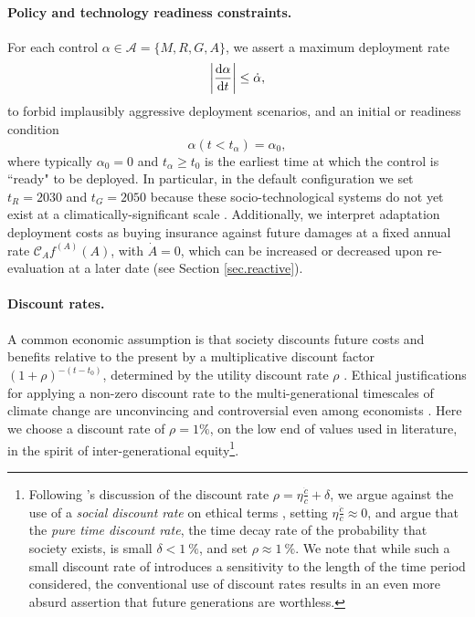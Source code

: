 \documentclass{article}
\begin{document}
\paragraph{Policy and technology readiness constraints.} For each control $\alpha \in \mathcal{A} = \{ M, R, G, A\}$, we assert a maximum deployment rate
\begin{equation}
    \abs{\dv{\alpha}{t}} \le \dot{\alpha},
\end{equation}
to forbid implausibly aggressive deployment scenarios, and an initial or readiness condition
\begin{equation}
    \alpha(t < t_{\alpha}) = \alpha_{0},
\end{equation} where typically $\alpha_{0} = 0$ and $t_{\alpha} \ge t_{0}$ is the earliest time at which the control is ``ready" to be deployed. In particular, in the default configuration we set $t_{R} = 2030$ and $t_{G} = 2050$ because these socio-technological systems do not yet exist at a climatically-significant scale \citep{minx_negative_2018, flegal_solar_2019}. Additionally, we interpret adaptation deployment costs as buying insurance against future damages at a fixed annual rate $\mathcal{C}_{A} f^{(A)}(A)$, with $\dot{A} = 0$, which can be increased or decreased upon re-evaluation at a later date (see Section \ref{sec.reactive}).

\paragraph{Discount rates.} A common economic assumption is that society discounts future costs and benefits relative to the present by a multiplicative discount factor $(1 + \rho)^{-(t-t_{0})}$, determined by the utility discount rate $\rho$ \citep[e.g. see reviews in][]{broome_discounting_1994, stern_economics_2007}. Ethical justifications for applying a non-zero discount rate to the multi-generational timescales of climate change are unconvincing and controversial even among economists \citep{ramsey_mathematical_1928, solow_economics_1974, stern_economics_2007}. Here we choose a discount rate of $\rho = 1\%$, on the low end of values used in literature, in the spirit of inter-generational equity\footnote{Following \cite{stern_economics_2007}'s discussion of the discount rate $\rho = \eta \frac{\dot{c}}{c} + \delta$, we argue against the use of a \textit{social discount rate} on ethical terms \citep{ramsey_mathematical_1928, solow_economics_1974}, setting $\eta \frac{\dot{c}}{c} \approx 0$, and argue that the \textit{pure time discount rate}, the time decay rate of the probability that society exists, is small $\delta < \SI{1}{\%}$, and set $\rho \approx \SI{1}{\%}$. We note that while such a small discount rate of introduces a sensitivity to the length of the time period considered, the conventional use of discount rates results in an even more absurd assertion that future generations are worthless.}. 
\end{document}
